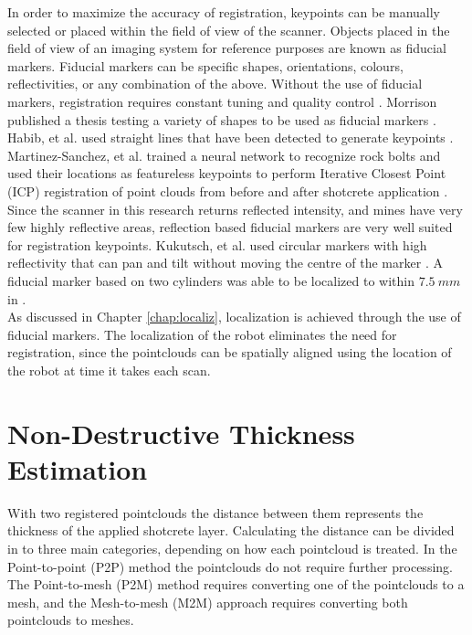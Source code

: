 In order to maximize the accuracy of registration, keypoints can be manually selected or placed within the field of view of the scanner. Objects placed in the field of view of an imaging system for reference purposes are known as fiducial markers. Fiducial markers can be specific shapes, orientations, colours, reflectivities, or any combination of the above. Without the use of fiducial markers, registration requires constant tuning and quality control \cite{reg3}. Morrison published a thesis testing a variety of shapes to be used as fiducial markers \cite{mark1}. Habib, et al. used straight lines that have been detected to generate keypoints \cite{key1}. Martinez-Sanchez, et al. trained a neural network to recognize rock bolts and used their locations as featureless keypoints to perform Iterative Closest Point (ICP) registration of point clouds from before and after shotcrete application \cite{reg2}.\\

Since the scanner in this research returns reflected intensity, and mines have very few highly reflective areas, reflection based fiducial markers are very well suited for registration keypoints. Kukutsch, et al. used circular markers with high reflectivity that can pan and tilt without moving the centre of the marker \cite{mark2}. A fiducial marker based on two cylinders was able to be localized to within $7.5\ mm$ in \cite{mark3}.\\

As discussed in Chapter \ref{chap:localiz}, localization is achieved through the use of fiducial markers. The localization of the robot eliminates the need for registration, since the pointclouds can be spatially aligned using the location of the robot at time it takes each scan.\\

\section{Non-Destructive Thickness Estimation}

With two registered pointclouds the distance between them represents the thickness of the applied shotcrete layer. Calculating the distance can be divided in to three main categories, depending on how each pointcloud is treated. In the Point-to-point (P2P) method the pointclouds do not require further processing. The Point-to-mesh (P2M) method requires converting one of the pointclouds to a mesh, and the Mesh-to-mesh (M2M) approach requires converting both pointclouds to meshes.\\

